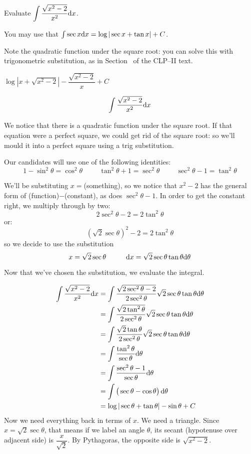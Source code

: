 \begin{question} Evaluate
$\displaystyle\int \frac{\sqrt{x^2-2}}{x^2}\mathrm{d}x$.

You may use that  $\int \sec x\mathrm{d}x = \log|\sec x+\tan x| +C$.
\end{question}

\begin{hint}
Note the quadratic function under the square root: you can solve this with trigonometric substitution, as in Section~ of the CLP--II text.
\end{hint}

\begin{answer}
$\log \left| x+{\sqrt{x^2-2}}
\right|-\dfrac{\sqrt{x^2-2}}{x}+C$
\end{answer}

\begin{solution}

\[\int \frac{\sqrt{x^2-2}}{x^2}\mathrm{d}x\]

We notice that there is a quadratic function under the square root. If that equation were a perfect square, we could get rid of the square root: so we'll mould it into a perfect square using a trig substitution.

Our candidates will use one of the following identities:
\[1-\sin^2\theta=\cos^2\theta \hspace{1cm} \tan^2\theta+1=\sec^2\theta \hspace{1cm} \sec^2\theta-1=\tan^2\theta\]

We'll be substituting $x=$(something), so we notice that $x^2-2$ has the general form of
(function)$-$(constant), as does $\sec^2\theta-1$. In order to get the constant right, we multiply through by two:
\[2\sec^2\theta-2=2\tan^2\theta\]
or:
\[(\sqrt{2}\sec \theta)^2-2=2\tan^2\theta\]
so we decide to use the substitution
\[x=\sqrt{2}\sec\theta\hspace{1cm}\mathrm{d}x=\sqrt{2}\sec\theta\tan\theta \mathrm{d}\theta\]

Now that we've chosen the substitution, we evaluate the integral.

\begin{align*}
\int\frac{\sqrt{x^2-2}}{x^2}\mathrm{d}x&=\int\frac{\sqrt{2\sec^2\theta-2}}{2\sec^2\theta}\sqrt{2}\sec\theta\tan\theta \mathrm{d}\theta\\
&=\int
\frac{\sqrt{2\tan^2\theta}}{2\sec^2\theta}\sqrt{2}\sec\theta\tan\theta
\mathrm{d}\theta\\
&=\int
\frac{\sqrt{2}\tan\theta}{2\sec^2\theta}\sqrt{2}\sec\theta\tan\theta
\mathrm{d}\theta\\
&=\int
\frac{\tan^2\theta}{\sec\theta}
\mathrm{d}\theta\\
&=
\int \frac{\sec^2\theta-1}{\sec\theta}\mathrm{d}\theta\\
&=\int \big(\sec\theta-\cos\theta\big)\, \mathrm{d}\theta\\
&=\log|\sec\theta + \tan\theta|-\sin\theta +C
\end{align*}
Now we need everything back in terms of $x$. We need a triangle. Since $x=\sqrt{2}\sec\theta$, that means if we label an angle $\theta$, its secant (hypotenuse over adjacent side) is $\dfrac{x}{\sqrt{2}}$. By Pythagoras, the opposite side is $\sqrt{x^2-2}$.


\end{solution}
